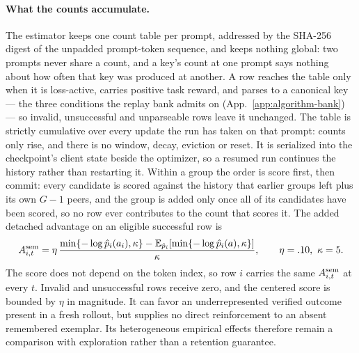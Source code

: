 \documentclass{article}
\newcommand{\1}{\mathbf 1}
\newcommand{\E}{\mathbb E}
\theoremstyle{remark}
\theoremstyle{definition}
\theoremstyle{plain}
\begin{document}
\paragraph{What the counts accumulate.}
The estimator keeps one count table per prompt, addressed by the SHA-256
digest of the unpadded prompt-token sequence, and keeps nothing global: two
prompts never share a count, and a key's count at one prompt says nothing
about how often that key was produced at another. A row reaches the table
only when it is loss-active, carries positive task reward, and parses to a
canonical key --- the three conditions the replay bank admits on
(App.~\ref{app:algorithm-bank}) --- so invalid, unsuccessful and unparseable
rows leave it unchanged. The table is strictly cumulative over every update
the run has taken on that prompt: counts only rise, and there is no window,
decay, eviction or reset. It is serialized into the checkpoint's client state
beside the optimizer, so a resumed run continues the history rather than
restarting it. Within a group the order is score first, then commit: every
candidate is scored against the history that earlier groups left plus its own
$G-1$ peers, and the group is added only once all of its candidates have been
scored, so no row ever contributes to the count that scores it.
The added detached advantage on an eligible successful row is
\begin{equation}
  A^{\rm sem}_{i,t}=\eta\,
  \frac{\min\{-\log\hat p_i(a_i),\kappa\}
    -\E_{\hat p_i}[\min\{-\log\hat p_i(a),\kappa\}]}{\kappa},
  \qquad \eta=.10,\ \kappa=5.
  \label{eq:legacy-semantic-advantage}
\end{equation}
The score does not depend on the token index, so row $i$ carries the same
$A^{\rm sem}_{i,t}$ at every $t$. Invalid and unsuccessful rows receive zero,
and the centered score is bounded by $\eta$ in magnitude. It can favor an underrepresented verified outcome
present in a fresh rollout, but supplies no direct reinforcement to an
absent remembered exemplar. Its heterogeneous empirical effects therefore
remain a comparison with exploration rather than a retention guarantee.
\end{document}
